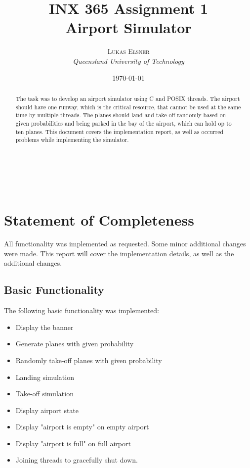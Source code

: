 \documentclass[a4paper, 12pt]{scrartcl} %
\title{\textbf{INX 365 Assignment 1}\\ %
Airport Simulator} %
\author{\textsc{Lukas Elsner} %
\\{\textit{Queensland University of Technology}}} %
\date{\today} %
\makeatletter
\renewcommand{\maketitle}{ %
  \begin{flushright} %
    {\LARGE\@title}\\ %
    \vspace{50pt} %
    {\large\@author} %
    \\\@date %
    \vspace{40pt} %
  \end{flushright}
}
\makeatother
\begin{document}
\maketitle %
\thispagestyle{empty}
\vspace{10em}
\begin{abstract}
The task was to develop an airport simulator using C and POSIX threads. The
airport should have one runway, which is the critical resource, that cannot be
used at the same time by multiple threads. The planes should land and take-off
randomly based on given probabilities and being parked in the bay of the
airport, which can hold op to ten planes. This document covers the
implementation report, as well as occurred problems while implementing the
simulator.
\end{abstract}
\newpage
\tableofcontents
\newpage

\section{Statement of Completeness}

All functionality was implemented as requested. Some minor additional changes
were made. This report will cover the implementation details, as well as the
additional changes.

\subsection{Basic Functionality}

The following basic functionality was implemented:
\begin{itemize}
    \item Display the banner
    \item Generate planes with given probability
    \item Randomly take-off planes with given probability
    \item Landing simulation
    \item Take-off simulation
    \item Display airport state
    \item Display "airport is empty" on empty airport
    \item Display "airport is full" on full airport
    \item Joining threads to gracefully shut down.
  \end{itemize}
\end{document}

